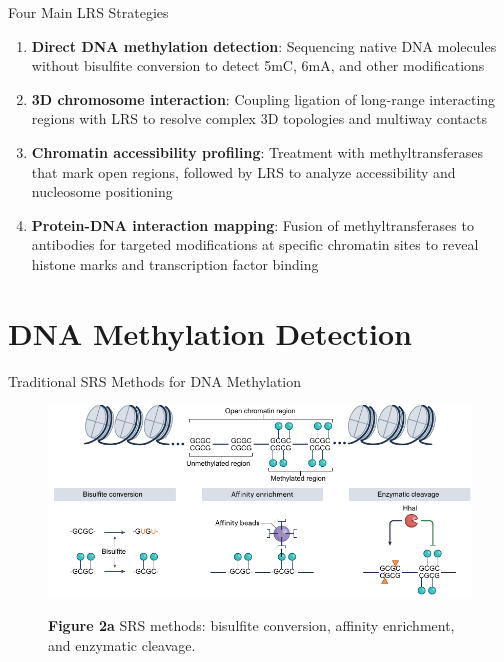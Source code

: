 \documentclass[aspectratio=169]{beamer}
\begin{document}
\begin{frame}{Four Main LRS Strategies}
  \begin{enumerate}
    \item \textbf{Direct DNA methylation detection}: Sequencing native DNA molecules without bisulfite conversion to detect 5mC, 6mA, and other modifications

    \item \textbf{3D chromosome interaction}: Coupling ligation of long-range interacting regions with LRS to resolve complex 3D topologies and multiway contacts

    \item \textbf{Chromatin accessibility profiling}: Treatment with methyltransferases that mark open regions, followed by LRS to analyze accessibility and nucleosome positioning

    \item \textbf{Protein-DNA interaction mapping}: Fusion of methyltransferases to antibodies for targeted modifications at specific chromatin sites to reveal histone marks and transcription factor binding
  \end{enumerate}
\end{frame}

\section{DNA Methylation Detection}

\begin{frame}{Traditional SRS Methods for DNA Methylation}
  \begin{figure}
    \centering
    \includegraphics[height=0.5\textheight]{figures/fig2a.pdf}

    {\small \textbf{Figure 2a} \textbar{} SRS methods: bisulfite conversion, affinity enrichment, and enzymatic cleavage.}
  \end{figure}
\end{frame}
\end{document}
